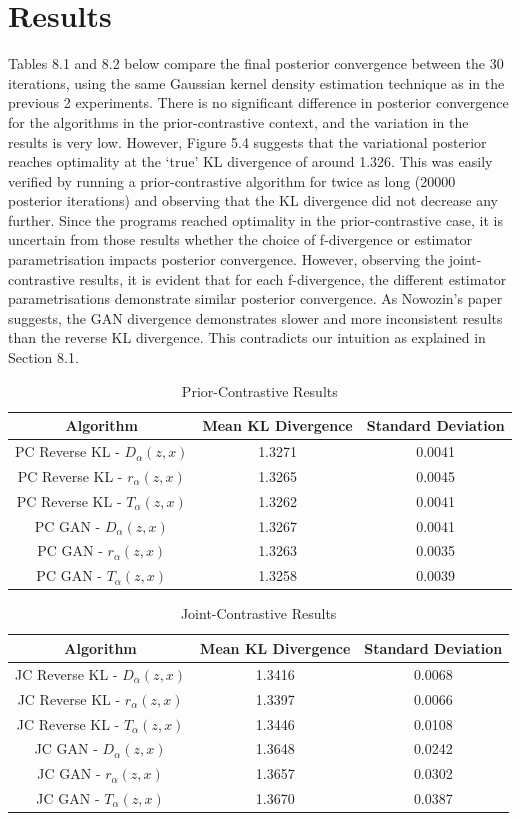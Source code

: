\documentclass[honours,12pt]{unswthesis}
\numberwithin{equation}{section}
\theoremstyle{definition}
\begin{document}
\section{Results}
Tables 8.1 and 8.2 below compare the final posterior convergence between the 30 iterations, using the same Gaussian kernel density estimation technique as in the previous 2 experiments. There is no significant difference in posterior convergence for the algorithms in the prior-contrastive context, and the variation in the results is very low. However, Figure 5.4 suggests that the variational posterior reaches optimality at the `true' KL divergence of around 1.326. This was easily verified by running a prior-contrastive algorithm for twice as long (20000 posterior iterations) and observing that the KL divergence did not decrease any further. Since the programs reached optimality in the prior-contrastive case, it is uncertain from those results whether the choice of f-divergence or estimator parametrisation impacts posterior convergence. However, observing the joint-contrastive results, it is evident that for each f-divergence, the different estimator parametrisations demonstrate similar posterior convergence. As Nowozin's paper suggests, the GAN divergence demonstrates slower and more inconsistent results than the reverse KL divergence. This contradicts our intuition as explained in Section 8.1.
\begin{table}[h!]
\centering
\begin{tabular}{|c|c|c|}
\hline
Algorithm & Mean KL Divergence & Standard Deviation\\
\hline
PC Reverse KL - $D_\alpha(z,x)$ & 1.3271 & 0.0041\\
\hline
PC Reverse KL - $r_\alpha(z,x)$ & 1.3265 & 0.0045\\
\hline
PC Reverse KL - $T_\alpha(z,x)$ & 1.3262 & 0.0041\\
\hline
PC GAN - $D_\alpha(z,x)$ & 1.3267 & 0.0041\\
\hline
PC GAN - $r_\alpha(z,x)$ & 1.3263 & 0.0035\\
\hline
PC GAN - $T_\alpha(z,x)$ & 1.3258 & 0.0039\\
\hline
\end{tabular}
\caption{Prior-Contrastive Results}
\end{table}
\begin{table}[h!]
\centering
\begin{tabular}{|c|c|c|}
\hline
Algorithm & Mean KL Divergence & Standard Deviation\\
\hline
JC Reverse KL - $D_\alpha(z,x)$ & 1.3416 & 0.0068\\
\hline
JC Reverse KL - $r_\alpha(z,x)$ & 1.3397 & 0.0066\\
\hline
JC Reverse KL - $T_\alpha(z,x)$ & 1.3446 & 0.0108\\
\hline
JC GAN - $D_\alpha(z,x)$ & 1.3648 & 0.0242\\
\hline
JC GAN - $r_\alpha(z,x)$ & 1.3657 & 0.0302\\
\hline
JC GAN - $T_\alpha(z,x)$ & 1.3670 & 0.0387\\
\hline
\end{tabular}
\caption{Joint-Contrastive Results}
\end{table}
\end{document}
